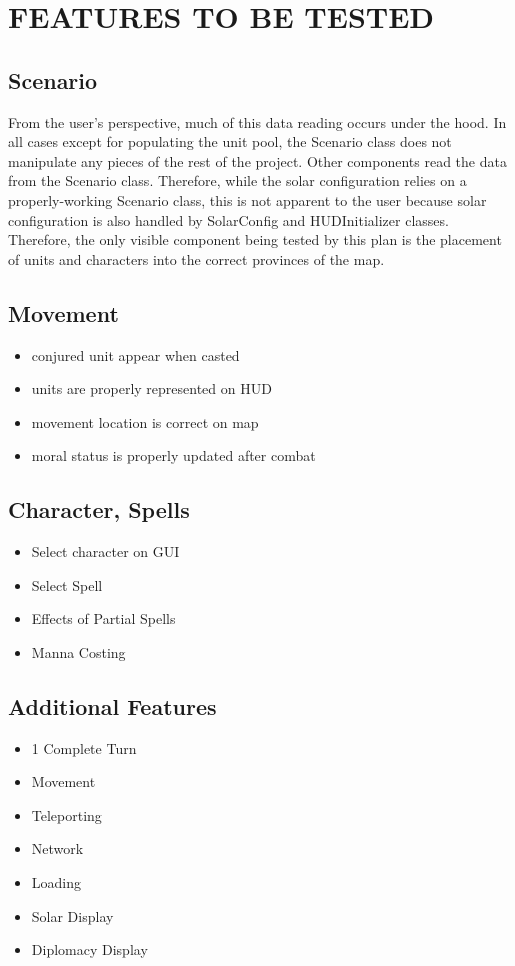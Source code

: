 \section[FEATURES TO BE TESTED]{\bfseries\color{black} FEATURES TO BE TESTED}
{\color{black}
\subsection{Scenario}
From the user's perspective, much of this data reading occurs under the hood. 
In all cases except for populating the unit pool, the Scenario class does not 
manipulate any pieces of the rest of the project. Other components read the 
data from the Scenario class. Therefore, while the solar configuration relies 
on a properly-working Scenario class, this is not apparent to the user because 
solar configuration is also handled by SolarConfig and HUDInitializer classes.
\newline
\newline
Therefore, the only visible component being tested by this plan is the placement 
of units and characters into the correct provinces of the map.

\subsection{Movement}

\begin{itemize}
\item conjured unit appear when casted
\item units are properly represented on HUD
\item movement location is correct on map
\item moral status is properly updated after combat
\end{itemize}

\subsection{Character, Spells}
\begin{itemize}
\item Select character on GUI
\item Select Spell
\item Effects of Partial Spells
\item Manna Costing
\end{itemize}
}

{\color{black}
\subsection {Additional Features}
\begin{itemize}
\item 1 Complete Turn
\item Movement
\item Teleporting
\item Network 
\item Loading
\item Solar Display
\item Diplomacy Display
\end{itemize}
}


